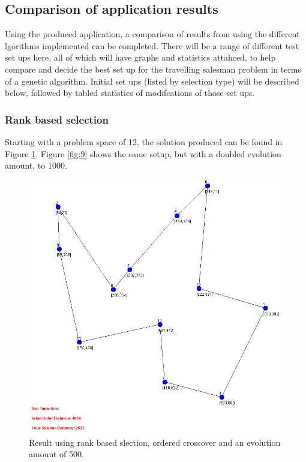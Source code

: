 \documentclass[article]{IEEEtran}
\begin{document}
\subsection{Comparison of application results}
Using the produced application, a comparison of results from using the different lgorithms implemented can be completed. There will be a range of different test set ups here, all of which will have graphs and statistics attahced, to help compare and decide the best set up for the travelling salesman problem in terms of a genetic algorithm. Initial set ups (listed by selection type) will be described below, followed by tabled statistics of modifcations of those set ups.

\subsubsection{Rank based selection}
Starting with a problem space of 12, the solution produced can be found in Figure \ref{fig:8}. Figure \ref{fig:9} shows the same setup, but with a doubled evolution amount, to 1000.
\begin{figure}[H]
\centering
  \includegraphics[width=.9\linewidth]{images/ordered_rank_015_500_false}
  \caption{Result using rank based slection, ordered crossover and an evolution amount of 500.}
  \label{fig:8}
\end{figure}
\end{document}
